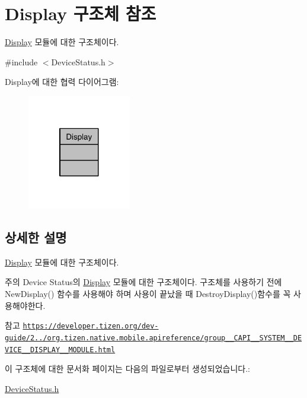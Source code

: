 \hypertarget{struct_display}{\section{Display 구조체 참조}
\label{struct_display}
}


\hyperlink{struct_display}{Display} 모듈에 대한 구조체이다.  




{\ttfamily \#include $<$Device\-Status.\-h$>$}



Display에 대한 협력 다이어그램\-:\nopagebreak
\begin{figure}[H]
\begin{center}
\leavevmode
\includegraphics[width=128pt]{d4/d2c/struct_display__coll__graph}
\end{center}
\end{figure}


\subsection{상세한 설명}
\hyperlink{struct_display}{Display} 모듈에 대한 구조체이다. 

\begin{DoxyNote}{주의}
Device Status의 \hyperlink{struct_display}{Display} 모듈에 대한 구조체이다. 구조체를 사용하기 전에 New\-Display() 함수를 사용해야 하며 사용이 끝났을 때 Destroy\-Display()함수를 꼭 사용해야한다. 
\end{DoxyNote}
\begin{DoxySeeAlso}{참고}
\href{https://developer.tizen.org/dev-guide/2.3.0/org.tizen.native.mobile.apireference/group__CAPI__SYSTEM__DEVICE__DISPLAY__MODULE.html}{\tt https\-://developer.\-tizen.\-org/dev-\/guide/2../org.\-tizen.\-native.\-mobile.\-apireference/group\-\_\-\-\_\-\-C\-A\-P\-I\-\_\-\-\_\-\-S\-Y\-S\-T\-E\-M\-\_\-\-\_\-\-D\-E\-V\-I\-C\-E\-\_\-\-\_\-\-D\-I\-S\-P\-L\-A\-Y\-\_\-\-\_\-\-M\-O\-D\-U\-L\-E.\-html} 
\end{DoxySeeAlso}


이 구조체에 대한 문서화 페이지는 다음의 파일로부터 생성되었습니다.\-:\begin{DoxyCompactItemize}
\item 
\hyperlink{_device_status_8h}{Device\-Status.\-h}\end{DoxyCompactItemize}
